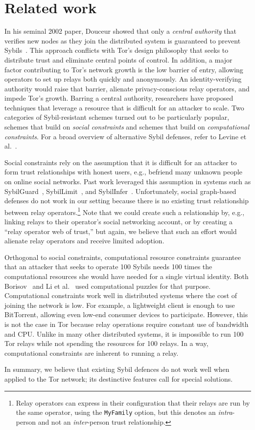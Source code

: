 \section{Related work}
\label{sec:related_work}
In his seminal 2002 paper, Douceur showed that only a \emph{central authority}
that verifies new nodes as they join the distributed system is guaranteed to
prevent Sybils~\cite{Douceur2002a}.  This approach conflicts with Tor's design
philosophy that seeks to distribute trust and eliminate central points of
control.  In addition, a major factor contributing to Tor's network growth is
the low barrier of entry, allowing operators to set up relays both quickly and
anonymously.  An identity-verifying authority would raise that barrier, alienate
privacy-conscious relay operators, and impede Tor's growth.  Barring a central
authority, researchers have proposed techniques that leverage a resource that is
difficult for an attacker to scale.  Two categories of Sybil-resistant schemes
turned out to be particularly popular, schemes that build on \emph{social
constraints} and schemes that build on \emph{computational constraints}.  For a
broad overview of alternative Sybil defenses, refer to Levine et
al.~\cite{Levine2006a}.

Social constraints rely on the assumption that it is difficult for an attacker
to form trust relationships with honest users, e.g., befriend many unknown
people on online social networks.  Past work leveraged this assumption in
systems such as SybilGuard~\cite{Yu2006a}, SybilLimit~\cite{Yu2008a}, and
SybilInfer~\cite{Danezis2009a}.  Unfortunately, social graph-based defenses
do not work in our setting because there is no existing trust relationship
between relay operators.\footnote{Relay operators can express in their
configuration that their relays are run by the same operator, using the
\texttt{MyFamily} option, but this denotes an \emph{intra}-person and not an
\emph{inter}-person trust relationship.} Note that we could create such a
relationship by, e.g., linking relays to their operator's social networking
account, or by creating a ``relay operator web of trust,'' but again, we
believe that such an effort would alienate relay operators and receive limited
adoption.

Orthogonal to social constraints, computational resource constraints guarantee
that an attacker that seeks to operate 100 Sybils needs 100 times the
computational resources she would have needed for a single virtual identity.
Both Borisov~\cite{Borisov2006a} and Li et al.~\cite{Li2012a} used computational
puzzles for that purpose.  Computational constraints work well in distributed
systems where the cost of joining the network is low.  For example, a
lightweight client is enough to use BitTorrent, allowing even low-end consumer
devices to participate.  However, this is not the case in Tor because relay
operations require constant use of bandwidth and CPU.  Unlike in many other
distributed systems, it is impossible to run 100 Tor relays while not spending
the resources for 100 relays.  In a way, computational constraints are inherent
to running a relay.

In summary, we believe that existing Sybil defences do not work well when
applied to the Tor network; its destinctive features call for special solutions.
